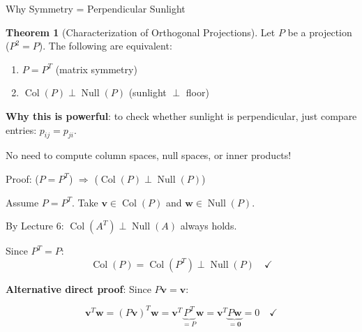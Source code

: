 \documentclass[10pt]{beamer}
\theoremstyle{definition}
\newtheorem{thm}{Theorem}[section]
\newcommand{\x}[1]{\alert{\textbf{#1}}}
\begin{document}
\begin{frame}{Why Symmetry = Perpendicular Sunlight}

\begin{thm}[Characterization of Orthogonal Projections]
Let $P$ be a projection ($P^2 = P$). The following are equivalent:
\begin{enumerate}
\item $P = P^T$ \quad (matrix symmetry)
\item $\operatorname{Col}(P) \perp \operatorname{Null}(P)$ \quad (sunlight $\perp$ floor)
\end{enumerate}
\end{thm}

\vspace{1em}

\x{Why this is powerful}: to check whether sunlight is perpendicular, just compare entries: $p_{ij} = p_{ji}$.

\vspace{0.5em}

No need to compute column spaces, null spaces, or inner products!

\end{frame}

\begin{frame}{Proof: ($P = P^T$) $\Rightarrow$ ($\operatorname{Col}(P) \perp \operatorname{Null}(P)$)}

Assume $P = P^T$. Take $\mathbf{v} \in \operatorname{Col}(P)$ and $\mathbf{w} \in \operatorname{Null}(P)$.

\vspace{0.5em}

By Lecture 6: $\operatorname{Col}(A^T) \perp \operatorname{Null}(A)$ always holds.

\vspace{0.5em}

Since $P^T = P$:
$$\operatorname{Col}(P) = \operatorname{Col}(P^T) \perp \operatorname{Null}(P) \quad\checkmark$$

\vspace{1em}

\x{Alternative direct proof}: Since $P\mathbf{v} = \mathbf{v}$:

$$\mathbf{v}^T\mathbf{w} = (P\mathbf{v})^T\mathbf{w} = \mathbf{v}^T \underbrace{P^T}_{= P}\mathbf{w} = \mathbf{v}^T \underbrace{P\mathbf{w}}_{= \mathbf{0}} = 0 \quad\checkmark$$

\end{frame}
\end{document}
